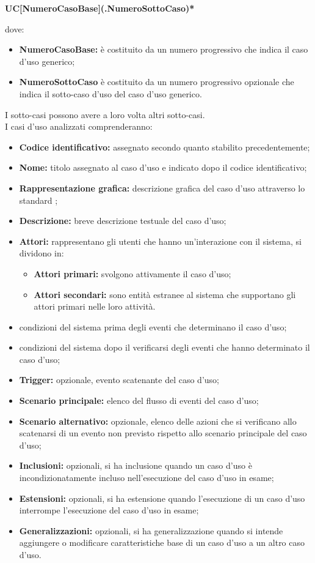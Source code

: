 \begin{center}
	\textbf{UC[NumeroCasoBase](.NumeroSottoCaso)*}
\end{center}
dove:
\begin{itemize}
	\item \textbf{NumeroCasoBase:} è costituito da un numero progressivo che indica il caso d'uso generico;
	\item \textbf{NumeroSottoCaso} è costituito da un numero progressivo opzionale che indica il sotto-caso d'uso del caso d'uso generico.
\end{itemize}  
I sotto-casi possono avere a loro volta altri sotto-casi.\\ 
I casi d'uso analizzati comprenderanno:
\begin{itemize}
	\item \textbf{Codice identificativo:} assegnato secondo quanto stabilito precedentemente;
	\item \textbf{Nome:} titolo assegnato al caso d'uso e indicato dopo il codice identificativo; 
	\item \textbf{Rappresentazione grafica:} descrizione grafica del caso d'uso attraverso lo standard ;
	\item \textbf{Descrizione:} breve descrizione testuale del caso d'uso;
	\item \textbf{Attori:} rappresentano gli utenti che hanno un'interazione con il sistema, si dividono in:
	\begin{itemize}
		\item \textbf{Attori primari:} svolgono attivamente il caso d'uso;
		\item \textbf{Attori secondari:} sono entità estranee al sistema che supportano gli attori primari nelle loro attività.
	\end{itemize}
	\item {} condizioni del sistema prima degli eventi che determinano il caso d'uso;
	\item {} condizioni del sistema dopo il verificarsi degli eventi che hanno determinato il caso d'uso;
	\item \textbf{Trigger:} opzionale, evento scatenante del caso d'uso;
	\item \textbf{Scenario principale:} elenco del flusso di eventi del caso d'uso;
	\item \textbf{Scenario alternativo:} opzionale, elenco delle azioni che si verificano allo scatenarsi di un evento non previsto rispetto allo scenario principale del caso d'uso;
	\item \textbf{Inclusioni:} opzionali, si ha inclusione quando un caso d'uso è incondizionatamente incluso nell'esecuzione del caso d'uso in esame;	
	\item \textbf{Estensioni:} opzionali, si ha estensione quando l'esecuzione di un caso d'uso interrompe l'esecuzione del caso d'uso in esame;
	\item \textbf{Generalizzazioni:} opzionali, si ha generalizzazione quando si intende aggiungere o modificare caratteristiche base di un caso d'uso a un altro caso d'uso.
\end{itemize}

